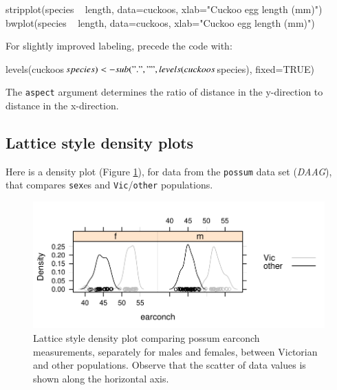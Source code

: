 \documentclass{tufte-book}\usepackage[]{graphicx}\usepackage[]{color}
\newcommand{\txtt}[1]{\texttt{#1}}
\begin{document}
\begin{Schunk}
\begin{Sinput}
stripplot(species ~ length, data=cuckoos,
          xlab="Cuckoo egg length (mm)")
bwplot(species ~ length, data=cuckoos,
       xlab="Cuckoo egg length (mm)")
\end{Sinput}
\end{Schunk}
\begin{marginfigure}[-36pt]
For slightly improved labeling, precede the code with:
\begin{Schunk}
\begin{Sinput}
levels(cuckoos$species) <-
 sub(".", " ",
  levels(cuckoos$species),
  fixed=TRUE)
\end{Sinput}
\end{Schunk}
\end{marginfigure}
The \txtt{aspect} argument determines the ratio of distance
in the y-direction to distance in the x-direction.

\subsection*{Lattice style density plots}
Here is a density plot (Figure \ref{fig:possumdens}), for data from
the \txtt{possum} data set (\textit{DAAG}), that compares \txtt{sex}es
and \txtt{Vic}/\txtt{other} populations.
\begin{figure}
\begin{center}
\begin{Schunk}


\centerline{\includegraphics[width=\textwidth]{figs/07-lattice-density-1} }

\end{Schunk}
\end{center}
  \caption{Lattice style density plot comparing possum earconch
    measurements, separately for males and females, between Victorian
    and other populations. Observe that the scatter of data values is
shown along the horizontal axis.}\label{fig:possumdens}
\vspace*{-36pt}
\end{figure}
\end{document}
